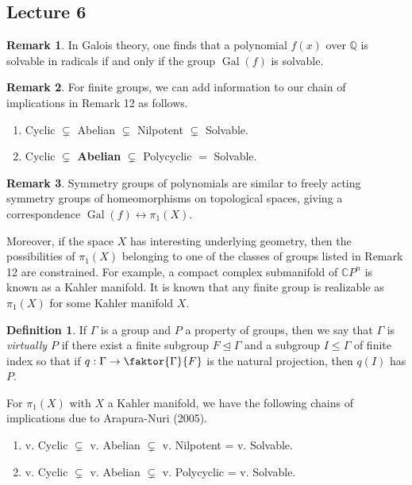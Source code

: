 \documentclass[10pt,letterpaper,cm]{nupset}
\theoremstyle{definition}
\newtheorem*{definition}{Definition}
\newtheorem{remark}{Remark}
\newcommand{\CP}{\mathbb CP}
\newcommand{\Q}{\mathbb Q}
\newcommand{\1}{\mathbf{1}}
\newcommand{\0}{\vec 0}
\DeclareMathOperator{\gal}{Gal}
\begin{document}
\subsection{Lecture 6}

\begin{remark}
In Galois theory, one finds that a polynomial $f(x)$ over $\Q$ is solvable in radicals if and only if the group $\gal(f)$ is solvable. 
\end{remark}

\begin{remark}
For finite groups, we can add information to our chain of implications in Remark 12 as follows.
\begin{enumerate}
\item Cyclic $\subsetneq$ Abelian $\subsetneq$ Nilpotent $\subsetneq$ Solvable.
\item Cyclic $\subsetneq$ \textbf{Abelian} $\subsetneq$ Polycyclic $\bm =$  Solvable.
\end{enumerate}
\end{remark}

\begin{remark}
Symmetry groups of polynomials are similar to freely acting symmetry groups of homeomorphisms on topological spaces, giving a correspondence $\gal(f) \longleftrightarrow \pi_1(X)$. 

Moreover, if the space $X$ has interesting underlying geometry, then the possibilities of $\pi_1(X)$ belonging to one of the classes of groups listed in Remark 12 are constrained. For example,
a compact complex submanifold of $\CP^n$ is known as a Kahler manifold. It is known that any finite group is realizable as $\pi_1(X)$ for some Kahler manifold $X$.
\begin{definition}
If $\Gamma$ is a group and $P$ a property of groups, then we say that $\Gamma$ is \textit{virtually $P$} if there exist a finite subgroup $F \unlhd \Gamma$ and a subgroup $I \leq \Gamma$ of finite index so that if $q: \Gamma \to \faktor{\Gamma}{F}$ is the natural projection, then $q(I)$ has $P$. 
\end{definition}
For $\pi_1(X)$ with $X$ a Kahler manifold, we have the following chains of implications due to Arapura-Nuri (2005).
\begin{enumerate}
\item v. Cyclic $\subsetneq$ v. Abelian $\subsetneq$ v. Nilpotent = v. Solvable.
\item v. Cyclic $\subsetneq$ v. Abelian $\subsetneq$ v. Polycyclic = v. Solvable.
\end{enumerate}
\end{remark}
\end{document}
